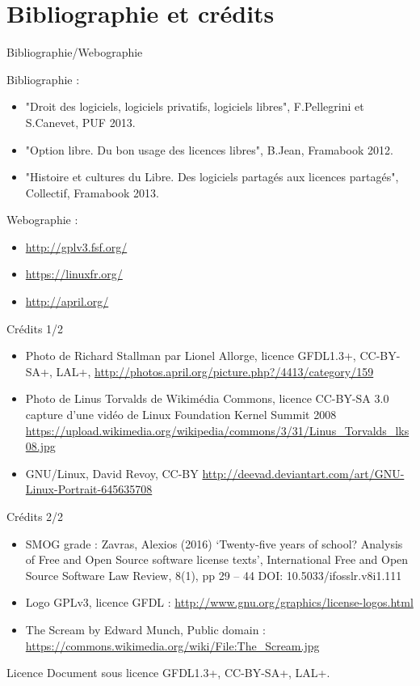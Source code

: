 \documentclass{beamer}
\begin{document}
\section{Bibliographie et crédits}

\begin{frame}{Bibliographie/Webographie}

Bibliographie :

  \begin{itemize}
  \item "Droit des logiciels, logiciels privatifs, logiciels libres", F.Pellegrini et S.Canevet, PUF 2013.
  \item "Option libre. Du bon usage des licences libres", B.Jean, Framabook 2012.
  \item "Histoire et cultures du Libre. Des logiciels partagés aux licences partagés", Collectif, Framabook 2013.
  \end{itemize}

Webographie :

\begin{itemize}
\item \url{http://gplv3.fsf.org/}
\item \url{https://linuxfr.org/}
\item \url{http://april.org/}
\end{itemize}
  
\end{frame}

\begin{frame}{Crédits 1/2}
  \begin{itemize}
  \item Photo de Richard Stallman par Lionel Allorge, licence GFDL1.3+, CC-BY-SA+, LAL+,  \url{http://photos.april.org/picture.php?/4413/category/159}
  \item Photo de Linus Torvalds de Wikimédia Commons, licence CC-BY-SA 3.0 capture d'une vidéo de Linux Foundation Kernel Summit 2008 \url{https://upload.wikimedia.org/wikipedia/commons/3/31/Linus_Torvalds_lks08.jpg}
  \item GNU/Linux, David Revoy, CC-BY \url{http://deevad.deviantart.com/art/GNU-Linux-Portrait-645635708}
   \end{itemize}
\end{frame}


\begin{frame}{Crédits 2/2}
  \begin{itemize}
\item SMOG grade : Zavras, Alexios (2016) ‘Twenty-five years of school? Analysis of Free and Open Source software license texts’, International Free and Open Source Software Law Review, 8(1),
pp 29 – 44 DOI: 10.5033/ifosslr.v8i1.111  
\item Logo GPLv3, licence GFDL : \url{http://www.gnu.org/graphics/license-logos.html}
\item The Scream by Edward Munch, Public domain : \url{https://commons.wikimedia.org/wiki/File:The_Scream.jpg}

  \end{itemize}
\end{frame}



\begin{frame}{Licence}
  Document sous licence GFDL1.3+, CC-BY-SA+, LAL+.
\end{frame}
\end{document}
